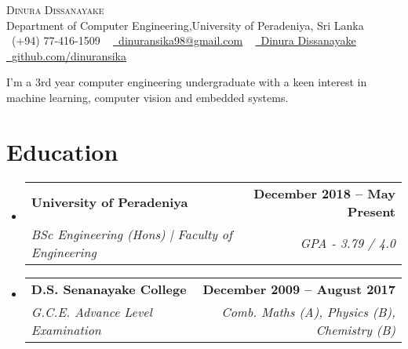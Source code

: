 \documentclass[letterpaper,11pt]{article}
\makeatletter
\newcommand{\resumeSubheading}[4]{
  \vspace{-2pt}\item
    \begin{tabular*}{1.0\textwidth}[t]{l@{\extracolsep{\fill}}r}
      \textbf{#1} & \textbf{\small #2} \\
      \textit{\small#3} & \textit{\small #4} \\
    \end{tabular*}\vspace{-7pt}
}
\newcommand{\resumeSubSubheading}[2]{
    \item
    \begin{tabular*}{1\textwidth}{l@{\extracolsep{\fill}}r}
      \textit{\small#1} & \textit{\small #2} \\
    \end{tabular*}\vspace{-7pt}
}
\newcommand{\resumeSubHeadingListStart}{\begin{itemize}[leftmargin=0.0in, label={}]}
\newcommand{\resumeSubHeadingListEnd}{\end{itemize}}
\makeatother
\begin{document}

\begin{center}
    {\Huge \scshape Dinura Dissanayake} \\ \vspace{1pt}
    Department of Computer Engineering,University of Peradeniya, Sri Lanka  \\ \vspace{1pt}
    \small \raisebox{-0.1\height}\faPhone\ (+94) 77-416-1509 ~ \href{mailto:dinuransika98@gmail.com}{\raisebox{-0.2\height}\faEnvelope\  \underline{dinuransika98@gmail.com}} ~ 
    \href{https://www.linkedin.com/in/dinura-dissanayake-9486ba1a1/}{\raisebox{-0.2\height}\faLinkedin\ \underline{Dinura Dissanayake}}  ~
    \href{https://github.com/dinuransika}{\raisebox{-0.2\height}\faGithub\ \underline{github.com/dinuransika}} \\ \vspace{1pt}
    \vspace{-8pt}
\end{center}

\vspace{2pt}
I’m a 3rd year computer engineering undergraduate with a keen interest in machine learning, computer vision and embedded systems.
\vspace{-2pt}
\section{Education}
  \resumeSubHeadingListStart
    \resumeSubheading
      {University of Peradeniya}{December 2018 -- May Present}
      {BSc Engineering (Hons) | Faculty of Engineering }{GPA - 3.79 / 4.0}
      \resumeSubheading
      {D.S. Senanayake College}{December 2009 -- August 2017}
      {G.C.E. Advance Level Examination}{Comb. Maths (A), Physics (B), Chemistry (B)}
  \resumeSubHeadingListEnd

\end{document}
